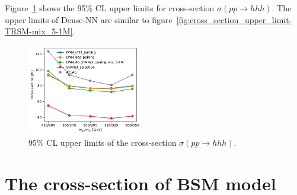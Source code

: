 \documentclass[12pt]{article}
\begin{document}
        Figure~\ref{fig:cross_section_upper_limit-TRSM-mix_5-150k} shows the 95\% CL upper limits for cross-section $\sigma\left( pp \to hhh \right)$. The upper limits of Dense-NN are similar to figure~\ref{fig:cross_section_upper_limit-TRSM-mix_5-1M}.
        \begin{figure}[htpb]
            \centering
            \includegraphics[width=0.45\textwidth]{cross_section_upper_limit-TRSM-mix_5-1M-ATLAS-24_nodes.pdf}
            \caption{95\% CL upper limits of the cross-section $\sigma\left( pp \to hhh \right)$.}
            \label{fig:cross_section_upper_limit-TRSM-mix_5-150k}
        \end{figure}

\section{The cross-section of BSM model}%
\label{sec:the_cross_section_of_bsm_model}
\end{document}
